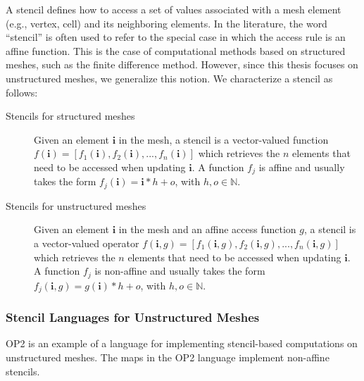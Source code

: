 A stencil defines how to access a set of values associated with a mesh element (e.g., vertex, cell) and its neighboring elements. In the literature, the word ``stencil'' is often used to refer to the special case in which the access rule is an affine function. This is the case of computational methods based on structured meshes, such as the finite difference method. However, since this thesis focuses on unstructured meshes, we generalize this notion. We characterize a stencil as follows:

\begin{description}
\item[Stencils for structured meshes] Given an element $\boldsymbol{i}$ in the mesh, a stencil is a vector-valued function $f(\boldsymbol{i}) = [f_1(\boldsymbol{i}), f_2(\boldsymbol{i}), ..., f_n(\boldsymbol{i})]$ which retrieves the $n$ elements that need to be accessed when updating $\boldsymbol{i}$. A function $f_j$ is affine and usually takes the form $f_j(\boldsymbol{i}) = \boldsymbol{i}*h + o$, with $h, o \in \mathbb{N}$.
\item[Stencils for unstructured meshes] Given an element $\boldsymbol{i}$ in the mesh and an affine access function $g$, a stencil is a vector-valued operator $f(\boldsymbol{i}, g) = [f_1(\boldsymbol{i}, g), f_2(\boldsymbol{i}, g), ..., f_n(\boldsymbol{i}, g)]$ which retrieves the $n$ elements that need to be accessed when updating $\boldsymbol{i}$. A function $f_j$ is non-affine and usually takes the form $f_j(\boldsymbol{i}, g) = g(\boldsymbol{i})*h + o$, with $h, o \in \mathbb{N}$.
\end{description}

\subsubsection{Stencil Languages for Unstructured Meshes}
OP2 is an example of a language for implementing stencil-based computations on unstructured meshes. The maps in the OP2 language implement non-affine stencils. 

